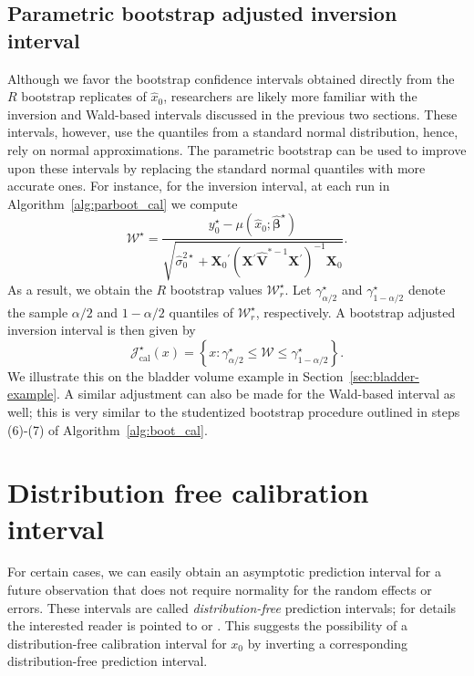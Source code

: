\documentclass[cmfont,usenames,dvipsnames,leqno]{afit-etd}\usepackage[]{graphicx}\usepackage[]{color}
\newcommand{\boot}{\star} %
\newcommand{\trans}{\ensuremath{^\prime}}
\newcommand{\mc}[1]{\ensuremath{\mathcal{#1}}}
\newcommand{\wh}[1]{\ensuremath{\widehat{#1}}}
\newcommand{\X}{\ensuremath{\bm{X}}}
\begin{document}
\subsection{Parametric bootstrap adjusted inversion interval}
Although we favor the bootstrap confidence intervals obtained directly from the $R$ bootstrap replicates of $\wh{x}_0$, researchers are likely more familiar with the inversion and Wald-based intervals discussed in the previous two sections. These intervals, however, use the quantiles from a standard normal distribution, hence, rely on normal approximations. The parametric bootstrap can be used to improve upon these intervals by replacing the standard normal quantiles with more accurate ones. For instance, for the inversion interval, at each run in Algorithm~\ref{alg:parboot_cal} we compute
\begin{equation*}
  \mc{W}^\boot = \frac{y_0^\boot - \mu\left(\wh{x}_0; \wh{\bm{\beta}}^\boot\right)}{\sqrt{\wh{\sigma}_0^{2\boot} + \X_0\trans\left(\X\trans\wh{\bm{V}}^{*-1}\X\trans\right)^{-1}\X_0}}.
\end{equation*}
As a result, we obtain the $R$ bootstrap values $\mc{W}_r^\boot$. Let $\gamma_{\alpha/2}^\boot$ and $\gamma_{1-\alpha/2}^\boot$ denote the sample $\alpha/2$ and $1-\alpha/2$ quantiles of $\mc{W}_r^\boot$, respectively. A bootstrap adjusted inversion interval is then given by
\begin{equation}
\label{eqn:cal-lmm-inversion-boot}
  \mc{J}_\mathrm{cal}^\boot(x) = \left\{ x: \gamma_{\alpha/2}^\boot \le \mc{W} \le \gamma_{1-\alpha/2}^\boot \right\}.
\end{equation}
We illustrate this on the bladder volume example in Section~\ref{sec:bladder-example}. A similar adjustment can also be made for the Wald-based interval as well; this is very similar to the studentized bootstrap procedure outlined in steps (6)-(7) of Algorithm~\ref{alg:boot_cal}.

\section{Distribution free calibration interval}
\label{sec:calibration-lmm-distfree}
For certain cases, we can easily obtain an asymptotic prediction interval for a future observation that does not require normality for the random effects or errors. These intervals are called \textit{distribution-free} prediction intervals; for details the interested reader is pointed to \citet{jiang_distribution_2002} or \citet{jiang_linear_2007}. This suggests the possibility of a distribution-free calibration interval for $x_0$ by inverting a corresponding distribution-free prediction interval.
\end{document}
